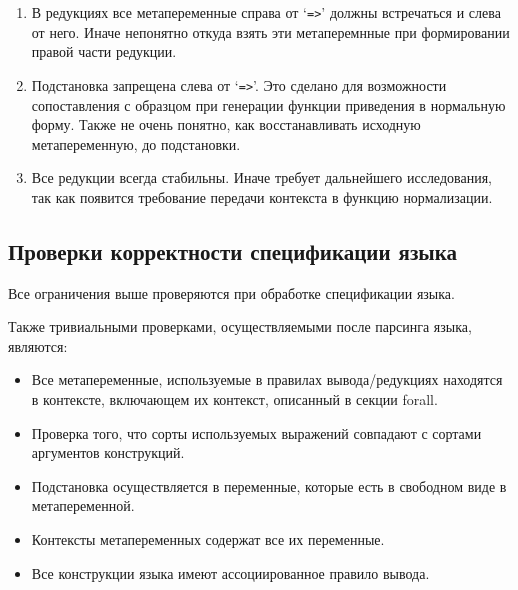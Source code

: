 \begin{enumerate}
\item В редукциях все метапеременные справа от `\lstinline{=>}' должны встречаться и слева от него. Иначе непонятно откуда взять эти метаперемнные при формировании правой части редукции.

\item Подстановка запрещена слева от `\lstinline{=>}'. Это сделано для возможности сопоставления с образцом при генерации функции приведения в нормальную форму. Также не очень понятно, как восстанавливать исходную метапеременную, до подстановки.

\item Все редукции всегда стабильны. Иначе требует дальнейшего исследования, так как появится требование передачи контекста в функцию нормализации.

\end{enumerate}

\subsection{Проверки корректности спецификации языка}

Все ограничения выше проверяются при обработке спецификации языка.

Также тривиальными проверками, осуществляемыми после парсинга языка, являются:
\begin{itemize}
\item Все метапеременные, используемые в правилах вывода/редукциях находятся в контексте, включающем их контекст, описанный в секции forall.
\item Проверка того, что сорты используемых выражений совпадают с сортами аргументов конструкций.
\item Подстановка осуществляется в переменные, которые есть в свободном виде в метапеременной.
\item Контексты метапеременных содержат все их переменные.
\item Все конструкции языка имеют ассоциированное правило вывода.
\end{itemize}
